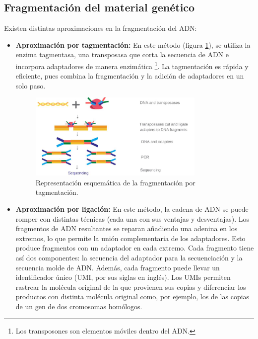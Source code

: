 \subsection{Fragmentación del material genético}
Existen distintas aproximaciones en la fragmentación del ADN:
\begin{itemize}
\item \textbf{Aproximación por tagmentación: }
En este método (figura \ref{fig:tagmentacion}), se utiliza la enzima tagmentasa, una transposasa que corta la secuencia de ADN e incorpora adaptadores de manera enzimática \footnote{Los transposones son elementos móviles dentro del ADN.}. La tagmentación es rápida y eficiente, pues combina la fragmentación y la adición de adaptadores en un solo paso.

\begin{figure}[htbp]
\centering
\includegraphics[width = 0.8\textwidth]{figs/tagmentation.png}
\caption{Representación esquemática de la fragmentación por tagmentación.}
\label{fig:tagmentacion}
\end{figure}

\item \textbf{Aproximación por ligación:} 
En este método, la cadena de ADN se puede romper con distintas técnicas (cada una con sus ventajas y desventajas). Los fragmentos de ADN resultantes se reparan añadiendo una adenina en los extremos, lo que permite la unión complementaria de los adaptadores. Esto produce fragmentos con un adaptador en cada extremo. Cada fragmento tiene así dos componentes: la secuencia del adaptador para la secuenciación y la secuencia molde de ADN. Además, cada fragmento puede llevar un identificador único (UMI, por sus siglas en inglés). Los UMIs permiten rastrear la molécula original de la que provienen sus copias y diferenciar los productos con distinta molécula original como, por ejemplo, los de las copias de un gen de dos cromosomas homólogos.


\end{itemize}
